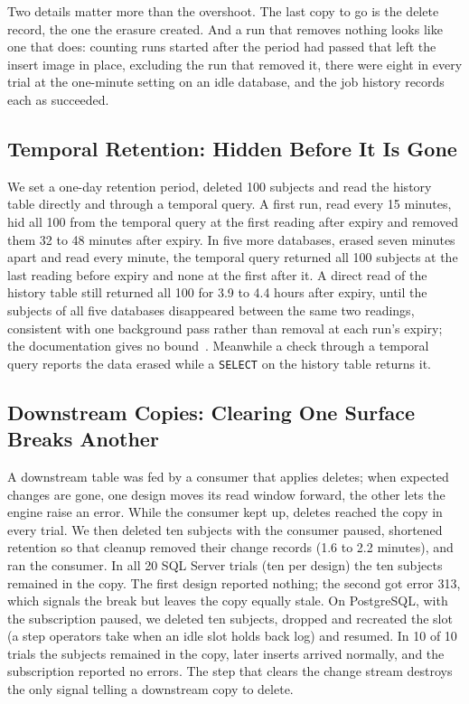 \documentclass[runningheads]{llncs}
\begin{document}
Two details matter more than the overshoot. The last copy to go is the delete record, the one the erasure created. And
a run that removes nothing looks like one that does: counting runs started after
the period had passed that left the insert image in place, excluding the run
that removed it, there were eight in every trial at the one-minute setting on an
idle database, and the job history records each as succeeded.

\subsection{Temporal Retention: Hidden Before It Is Gone}

We set a one-day retention period, deleted 100 subjects and read the history
table directly and through a temporal query. A first run, read every 15
minutes, hid all 100 from the temporal query at the first reading after expiry
and removed them 32 to 48 minutes after expiry. In five more databases, erased
seven minutes apart and read every minute, the temporal query returned all 100
subjects at the last reading before expiry and none at the first after it. A direct read of the history table still
returned all 100 for 3.9 to 4.4 hours after expiry, until the subjects of all
five databases disappeared between the same two readings, consistent with one
background pass rather than removal at each run's expiry; the documentation
gives no bound~\cite{mstemporal}. Meanwhile a check through a temporal query reports
the data erased while a \texttt{SELECT} on the history table returns it.

\subsection{Downstream Copies: Clearing One Surface Breaks Another}

A downstream table was fed by a consumer that applies deletes; when expected
changes are gone, one design moves its read window forward, the other lets the
engine raise an error. While the consumer kept up, deletes reached the copy in every trial.
We then deleted ten subjects with the consumer paused, shortened retention so
that cleanup removed their change records (1.6 to 2.2 minutes), and ran the
consumer. In all 20 SQL Server trials (ten per design) the ten subjects
remained in the copy.
The first design reported nothing; the second got error 313, which signals the
break but leaves the copy equally stale. On PostgreSQL, with the subscription paused,
we deleted ten subjects, dropped and recreated the slot (a step operators take
when an idle slot holds back log) and resumed. In 10 of 10 trials the subjects
remained in the copy, later inserts arrived normally, and the subscription
reported no errors. The step that clears the change stream destroys the only
signal telling a downstream copy to delete.
\end{document}
